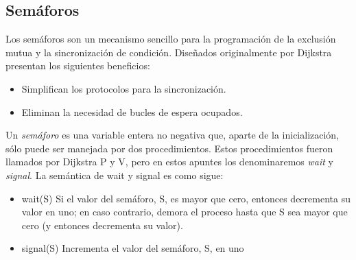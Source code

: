 \subsection{Semáforos}

Los semáforos son un mecanismo sencillo para la programación de la exclusión
mutua y la sincronización de condición. Diseñados originalmente por Dijkstra
presentan los siguientes beneficios:

\begin{itemize}
	\item Simplifican los protocolos para la sincronización.
	\item Eliminan la necesidad de bucles de espera ocupados.
\end{itemize}

Un \emph{semáforo} es una variable entera no negativa que, aparte de la
inicialización, sólo puede ser manejada por dos procedimientos. Estos
procedimientos fueron llamados por Dijkstra P y V, pero en estos apuntes los
denominaremos \emph{wait} y \emph{signal}. La semántica de wait y signal es como
sigue:

\begin{itemize}
	\item wait(S) Si el valor del semáforo, S, es mayor que cero, entonces
		decrementa su valor en uno; en caso contrario, demora el proceso
		hasta que S sea mayor que cero (y entonces decrementa su valor).
	\item signal(S) Incrementa el valor del semáforo, S, en uno
\end{itemize}
